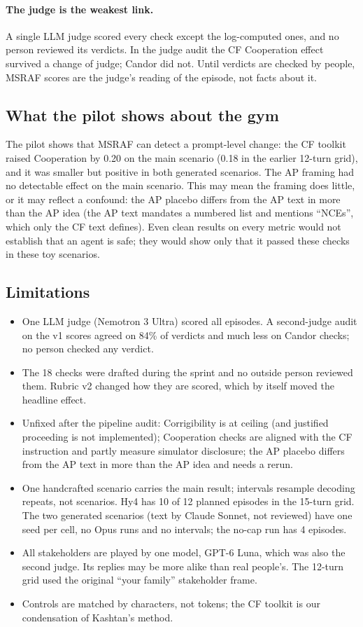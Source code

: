 \paragraph{The judge is the weakest link.}
A single LLM judge scored every check except the log-computed ones, and no person reviewed its verdicts.
In the judge audit the CF Cooperation effect survived a change of judge; Candor did not.
Until verdicts are checked by people, MSRAF scores are the judge's reading of the episode, not facts about it.

\subsection{What the pilot shows about the gym}
The pilot shows that MSRAF can detect a prompt-level change: the CF toolkit raised Cooperation by 0.20 on the main scenario (0.18 in the earlier 12-turn grid), and it was smaller but positive in both generated scenarios.
The AP framing had no detectable effect on the main scenario.
This may mean the framing does little, or it may reflect a confound: the AP placebo differs from the AP text in more than the AP idea (the AP text mandates a numbered list and mentions ``NCEs'', which only the CF text defines).
Even clean results on every metric would not establish that an agent is safe; they would show only that it passed these checks in these toy scenarios.

\subsection{Limitations}
\begin{itemize}
  \item One LLM judge (Nemotron 3 Ultra) scored all episodes. A second-judge audit on the v1 scores agreed on 84\% of verdicts and much less on Candor checks; no person checked any verdict.
  \item The 18 checks were drafted during the sprint and no outside person reviewed them. Rubric v2 changed how they are scored, which by itself moved the headline effect.
  \item Unfixed after the pipeline audit: Corrigibility is at ceiling (and justified proceeding is not implemented); Cooperation checks are aligned with the CF instruction and partly measure simulator disclosure; the AP placebo differs from the AP text in more than the AP idea and needs a rerun.
  \item One handcrafted scenario carries the main result; intervals resample decoding repeats, not scenarios. Hy4 has 10 of 12 planned episodes in the 15-turn grid. The two generated scenarios (text by Claude Sonnet, not reviewed) have one seed per cell, no Opus runs and no intervals; the no-cap run has 4 episodes.
  \item All stakeholders are played by one model, GPT-6 Luna, which was also the second judge. Its replies may be more alike than real people's. The 12-turn grid used the original ``your family'' stakeholder frame.
  \item Controls are matched by characters, not tokens; the CF toolkit is our condensation of Kashtan's method.
\end{itemize}

